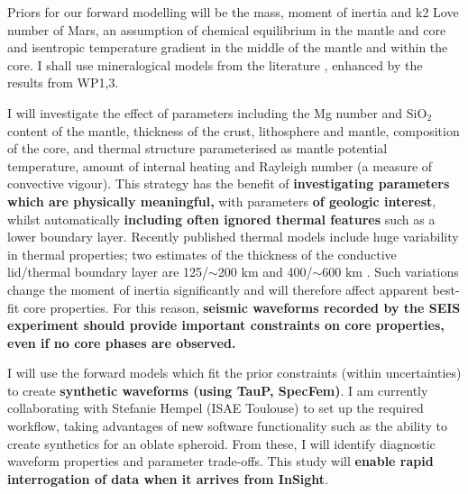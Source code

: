 \documentclass[11pt,twoside,a4paper]{article}
\begin{document}
Priors for our forward modelling will be the mass, moment of inertia and k2 Love number of Mars, an assumption of chemical equilibrium in the mantle and core and isentropic temperature gradient in the middle of the mantle and within the core. I shall use mineralogical models from the literature \citep[e.g.][]{SLB2011}, enhanced by the results from WP1,3. 

I will investigate the effect of parameters including the Mg number and SiO$_2$ content of the mantle, thickness of the crust, lithosphere and mantle, composition of the core, and thermal structure parameterised as mantle potential temperature, amount of internal heating and Rayleigh number (a measure of convective vigour). This strategy \citep[which will follow that described in][]{MJP2005} has the benefit of \textbf{investigating parameters which are physically meaningful,} with parameters \textbf{of geologic interest}, whilst automatically \textbf{including often ignored thermal features} such as a lower boundary layer. Recently published thermal models include huge variability in thermal properties; two estimates of the thickness of the conductive lid/thermal boundary layer are 125/$\sim$200 km \citep{NF2013} and 400/$\sim$600 km \citep{KC2008}. Such variations change the moment of inertia significantly and will therefore affect apparent best-fit core properties. For this reason, \textbf{seismic waveforms recorded by the SEIS experiment should provide important constraints on core properties, even if no core phases are observed.}

I will use the forward models which fit the prior constraints (within uncertainties) to create \textbf{synthetic waveforms (using TauP, SpecFem)}. I am currently collaborating with Stefanie Hempel (ISAE Toulouse) to set up the required workflow, taking advantages of new software functionality such as the ability to create synthetics for an oblate spheroid. From these, I will identify diagnostic waveform properties and parameter trade-offs. This study will \textbf{enable rapid interrogation of data when it arrives from InSight}. 
\end{document}
